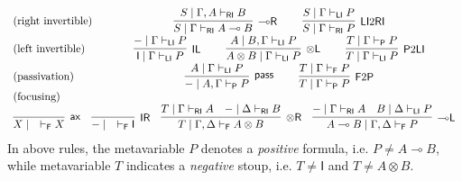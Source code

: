 \documentclass[submission,copyright,creativecommons]{eptcs}
\theoremstyle{definition}
\newcommand{\tl}{\otimes \mathsf{L}}
\newcommand{\tr}{\otimes \mathsf{R}}
\newcommand{\lright}{{\multimap}\mathsf{R}}
\newcommand{\lleft}{{\multimap}\mathsf{L}}
\newcommand{\pass}{\mathsf{pass}}
\newcommand{\unitl}{\mathsf{IL}}
\newcommand{\unitr}{\mathsf{IR}}
\newcommand{\ax}{\mathsf{ax}}
\newcommand{\ot}{\otimes}
\newcommand{\lolli}{\multimap}
\newcommand{\I}{\mathsf{I}}
\newcommand{\RI}{\mathsf{RI}}
\newcommand{\LI}{\mathsf{LI}}
\newcommand{\Pass}{\mathsf{P}}
\newcommand{\F}{\mathsf{F}}
\newcommand{\proofbox}[1]{\begin{tabular}{l} #1 \end{tabular}}
\begin{document}
\begin{equation}\label{eq:naive}
  \begin{array}{lc}
    \text{(right invertible)} & %
    \proofbox{
    \infer[\lright]{S \mid \Gamma \vdash_{\RI} A \lolli B}{S \mid \Gamma , A \vdash_{\RI} B}
    \qquad
    \infer[\LI 2 \RI]{S \mid \Gamma \vdash_{\RI} P}{S \mid \Gamma \vdash_{\LI} P}
    }
    \\[6pt]
    \text{(left invertible)} & %
    \proofbox{
    \infer[\unitl]{\I \mid \Gamma \vdash_{\LI} P}{- \mid \Gamma \vdash_{\LI} P}
    \qquad
    \infer[\tl]{A \ot B \mid \Gamma \vdash_{\LI} P}{A \mid B , \Gamma \vdash_{\LI} P}
    \qquad
    \infer[\Pass 2 \LI]{T \mid \Gamma \vdash_{\LI} P}{T \mid \Gamma \vdash_{\Pass} P}
    }
    \\[6pt]
    \text{(passivation)} & %
    \proofbox{
      \infer[\pass]{- \mid A , \Gamma \vdash_{\Pass} P }{
      A\mid \Gamma \vdash_{\LI} P
    }
    \qquad
    \infer[\F 2 \Pass]{T \mid \Gamma \vdash_{\Pass} P}{
      T \mid \Gamma \vdash_{\F} P
    }
    }
    \\
    \text{(focusing)} &    \\ %
    \multicolumn{2}{c}{
    \infer[\ax]{X \mid \quad \vdash_{\F} X}{}
    \quad
    \infer[\unitr]{- \mid \quad \vdash_{\F} \I}{}
    \quad
    \infer[\tr]{T \mid \Gamma , \Delta \vdash_{\F} A \ot B}{
      T \mid \Gamma \vdash_{\RI} A
      &
      - \mid \Delta \vdash_{\RI} B
    }
    \quad
    \infer[\lleft]{A \lolli B \mid \Gamma , \Delta \vdash_{\F} P}{
      - \mid \Gamma \vdash_{\RI} A
      &
      B \mid \Delta \vdash_{\LI} P
    }
    }
  \end{array}
\end{equation}
In above rules, the metavariable $P$ denotes a \emph{positive} formula, i.e. $P \not= A \lolli B$, while metavariable $T$ indicates a \emph{negative} stoup, i.e. $T \not= \I$ and $T\not= A \ot B$.
\end{document}
